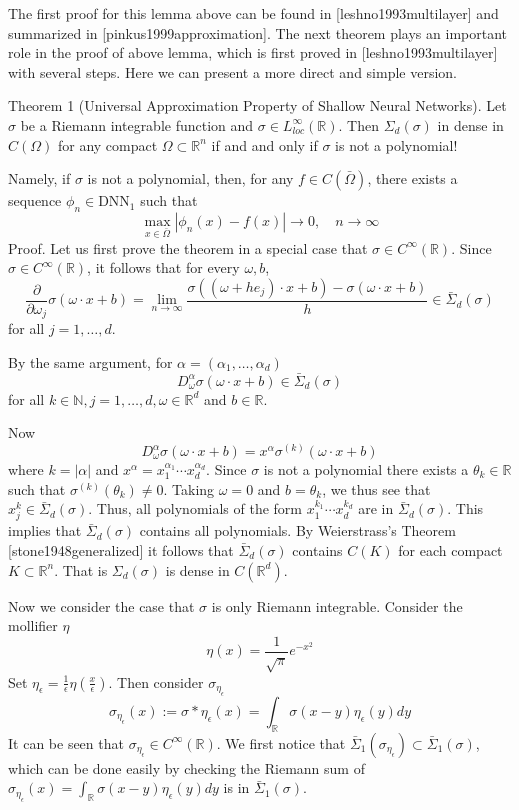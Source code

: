 \documentclass[10pt]{article}
\begin{document}
The first proof for this lemma above can be found in [leshno1993multilayer] and summarized in [pinkus1999approximation]. The next theorem plays an important role in the proof of above lemma, which is first proved in [leshno1993multilayer] with several steps. Here we can present a more direct and simple version.

Theorem 1 (Universal Approximation Property of Shallow Neural Networks). Let $\sigma$ be a Riemann integrable function and $\sigma \in L_{l o c}^{\infty}(\mathbb{R}) .$ Then $\Sigma_{d}(\sigma)$ in dense in $C(\Omega)$ for any compact $\Omega \subset \mathbb{R}^{n}$ if and and only if $\sigma$ is not a polynomial!

Namely, if $\sigma$ is not a polynomial, then, for any $f \in C(\bar{\Omega})$, there exists a sequence $\phi_{n} \in \mathrm{DNN}_{1}$ such that
$$
\max _{x \in \bar{\Omega}}\left|\phi_{n}(x)-f(x)\right| \rightarrow 0, \quad n \rightarrow \infty
$$
Proof. Let us first prove the theorem in a special case that $\sigma \in C^{\infty}(\mathbb{R}) .$ Since $\sigma \in C^{\infty}(\mathbb{R})$, it follows that for every $\omega, b$,
$$
\frac{\partial}{\partial \omega_{j}} \sigma(\omega \cdot x+b)=\lim _{n \rightarrow \infty} \frac{\sigma\left(\left(\omega+h e_{j}\right) \cdot x+b\right)-\sigma(\omega \cdot x+b)}{h} \in \bar{\Sigma}_{d}(\sigma)
$$
for all $j=1, \ldots, d$.

By the same argument, for $\alpha=\left(\alpha_{1}, \ldots, \alpha_{d}\right)$
$$
D_{\omega}^{\alpha} \sigma(\omega \cdot x+b) \in \bar{\Sigma}_{d}(\sigma)
$$
for all $k \in \mathbb{N}, j=1, \ldots, d, \omega \in \mathbb{R}^{d}$ and $b \in \mathbb{R}$.

Now
$$
D_{\omega}^{\alpha} \sigma(\omega \cdot x+b)=x^{\alpha} \sigma^{(k)}(\omega \cdot x+b)
$$
where $k=|\alpha|$ and $x^{\alpha}=x_{1}^{\alpha_{1}} \cdots x_{d}^{\alpha_{d}}$. Since $\sigma$ is not a polynomial there exists a $\theta_{k} \in \mathbb{R}$ such that $\sigma^{(k)}\left(\theta_{k}\right) \neq 0$. Taking $\omega=0$ and $b=\theta_{k}$, we thus see that $x_{j}^{k} \in \bar{\Sigma}_{d}(\sigma) .$ Thus, all polynomials of the form $x_{1}^{k_{1}} \cdots x_{d}^{k_{d}}$ are in $\bar{\Sigma}_{d}(\sigma)$. This implies that $\bar{\Sigma}_{d}(\sigma)$ contains all polynomials. By Weierstrass's Theorem [stone1948generalized] it follows that $\bar{\Sigma}_{d}(\sigma)$ contains $C(K)$ for each compact $K \subset \mathbb{R}^{n} .$ That is $\Sigma_{d}(\sigma)$ is dense in $C\left(\mathbb{R}^{d}\right) .$

Now we consider the case that $\sigma$ is only Riemann integrable. Consider the mollifier $\eta$
$$
\eta(x)=\frac{1}{\sqrt{\pi}} e^{-x^{2}}
$$
Set $\eta_{\epsilon}=\frac{1}{\epsilon} \eta\left(\frac{x}{\epsilon}\right) .$ Then consider $\sigma_{\eta_{\epsilon}}$
$$
\sigma_{\eta_{\epsilon}}(x):=\sigma * \eta_{\epsilon}(x)=\int_{\mathbb{R}} \sigma(x-y) \eta_{\epsilon}(y) d y
$$
It can be seen that $\sigma_{\eta_{\epsilon}} \in C^{\infty}(\mathbb{R}) .$ We first notice that $\bar{\Sigma}_{1}\left(\sigma_{\eta_{\epsilon}}\right) \subset \bar{\Sigma}_{1}(\sigma)$, which can be done easily by checking the Riemann sum of $\sigma_{\eta_{\epsilon}}(x)=\int_{\mathbb{R}} \sigma(x-y) \eta_{\epsilon}(y) d y$ is in $\bar{\Sigma}_{1}(\sigma)$.
\end{document}
